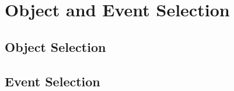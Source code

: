 \chapter{Object and Event Selection}
\label{chap:ObjEvt}

\section{Object Selection}

\section{Event Selection}

